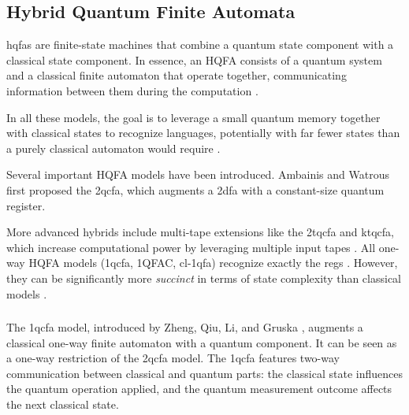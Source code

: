 \subsection{Hybrid Quantum Finite Automata}
\label{sec:hybrid-qfa}

\glspl{hqfa} are finite-state machines that combine a quantum state component with a classical state component. In essence, an HQFA consists of a quantum system and a classical finite automaton that operate together, communicating information between them during the computation \cite{li2015hybrid}.

In all these models, the goal is to leverage a small quantum memory together with classical states to recognize languages, potentially with far fewer states than a purely classical automaton would require \cite{zheng2012one}.

Several important HQFA models have been introduced. Ambainis and Watrous \cite{ambainis2002two} first proposed the \gls{2qcfa}, which augments a \gls{2dfa} with a constant-size quantum register. 

More advanced hybrids include multi-tape extensions like the \gls{2tqcfa} and \gls{ktqcfa}, which increase computational power by leveraging multiple input tapes \cite{zheng2011two}. All one-way HQFA models (\gls{1qcfa}, 1QFAC, \gls{cl-1qfa}) recognize exactly the \glspl{reg} \cite{li2015hybrid, zheng2012one}. However, they can be significantly more \textit{succinct} in terms of state complexity than classical models \cite{xiao2021state}.

\subsubsection{}

The \gls{1qcfa} model, introduced by Zheng, Qiu, Li, and Gruska \cite{zheng2012one}, augments a classical one-way finite automaton with a quantum component. It can be seen as a one-way restriction of the \gls{2qcfa} model. The \gls{1qcfa} features two-way communication between classical and quantum parts: the classical state influences the quantum operation applied, and the quantum measurement outcome affects the next classical state.

